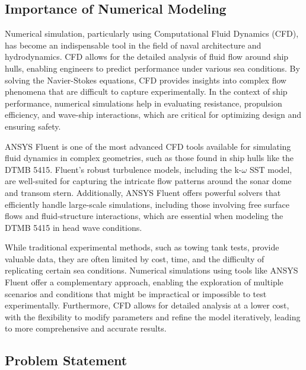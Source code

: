 \documentclass[12pt]{article} %
\begin{document}
\subsection{Importance of Numerical Modeling}
Numerical simulation, particularly using Computational Fluid Dynamics (CFD), has become an 
indispensable tool in the field of naval architecture and hydrodynamics. CFD allows for the 
detailed analysis of fluid flow around ship hulls, enabling engineers to predict performance 
under various sea conditions. By solving the Navier-Stokes equations, CFD provides insights 
into complex flow phenomena that are difficult to capture experimentally. In the context of 
ship performance, numerical simulations help in evaluating resistance, propulsion efficiency, 
and wave-ship interactions, which are critical for optimizing design and ensuring safety.


ANSYS Fluent is one of the most advanced CFD tools available for simulating fluid dynamics in 
complex geometries, such as those found in ship hulls like the DTMB 5415. Fluent's robust 
turbulence models, including the k-$\omega$ SST model, are well-suited for capturing the intricate 
flow patterns around the sonar dome and transom stern. Additionally, ANSYS Fluent offers 
powerful solvers that efficiently handle large-scale simulations, including those involving 
free surface flows and fluid-structure interactions, which are essential when modeling 
the DTMB 5415 in head wave conditions.


While traditional experimental methods, such as towing tank tests, provide valuable data, 
they are often limited by cost, time, and the difficulty of replicating certain sea conditions. 
Numerical simulations using tools like ANSYS Fluent offer a complementary approach, 
enabling the exploration of multiple scenarios and conditions that might be impractical or 
impossible to test experimentally. Furthermore, CFD allows for detailed analysis at a lower cost, 
with the flexibility to modify parameters and refine the model iteratively, leading to more 
comprehensive and accurate results.

\subsection{Problem Statement}
\end{document}
